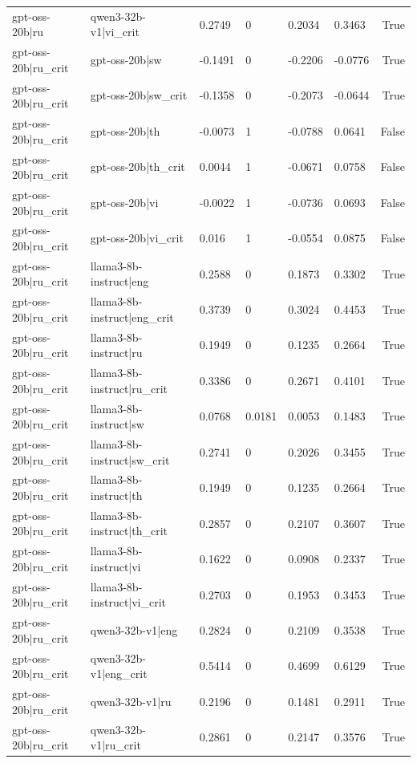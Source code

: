 \begin{table}
\begin{tabular}{llllllr}
gpt-oss-20b|ru & qwen3-32b-v1|vi_crit & 0.2749 & 0 & 0.2034 & 0.3463 & True \\
gpt-oss-20b|ru_crit & gpt-oss-20b|sw & -0.1491 & 0 & -0.2206 & -0.0776 & True \\
gpt-oss-20b|ru_crit & gpt-oss-20b|sw_crit & -0.1358 & 0 & -0.2073 & -0.0644 & True \\
gpt-oss-20b|ru_crit & gpt-oss-20b|th & -0.0073 & 1 & -0.0788 & 0.0641 & False \\
gpt-oss-20b|ru_crit & gpt-oss-20b|th_crit & 0.0044 & 1 & -0.0671 & 0.0758 & False \\
gpt-oss-20b|ru_crit & gpt-oss-20b|vi & -0.0022 & 1 & -0.0736 & 0.0693 & False \\
gpt-oss-20b|ru_crit & gpt-oss-20b|vi_crit & 0.016 & 1 & -0.0554 & 0.0875 & False \\
gpt-oss-20b|ru_crit & llama3-8b-instruct|eng & 0.2588 & 0 & 0.1873 & 0.3302 & True \\
gpt-oss-20b|ru_crit & llama3-8b-instruct|eng_crit & 0.3739 & 0 & 0.3024 & 0.4453 & True \\
gpt-oss-20b|ru_crit & llama3-8b-instruct|ru & 0.1949 & 0 & 0.1235 & 0.2664 & True \\
gpt-oss-20b|ru_crit & llama3-8b-instruct|ru_crit & 0.3386 & 0 & 0.2671 & 0.4101 & True \\
gpt-oss-20b|ru_crit & llama3-8b-instruct|sw & 0.0768 & 0.0181 & 0.0053 & 0.1483 & True \\
gpt-oss-20b|ru_crit & llama3-8b-instruct|sw_crit & 0.2741 & 0 & 0.2026 & 0.3455 & True \\
gpt-oss-20b|ru_crit & llama3-8b-instruct|th & 0.1949 & 0 & 0.1235 & 0.2664 & True \\
gpt-oss-20b|ru_crit & llama3-8b-instruct|th_crit & 0.2857 & 0 & 0.2107 & 0.3607 & True \\
gpt-oss-20b|ru_crit & llama3-8b-instruct|vi & 0.1622 & 0 & 0.0908 & 0.2337 & True \\
gpt-oss-20b|ru_crit & llama3-8b-instruct|vi_crit & 0.2703 & 0 & 0.1953 & 0.3453 & True \\
gpt-oss-20b|ru_crit & qwen3-32b-v1|eng & 0.2824 & 0 & 0.2109 & 0.3538 & True \\
gpt-oss-20b|ru_crit & qwen3-32b-v1|eng_crit & 0.5414 & 0 & 0.4699 & 0.6129 & True \\
gpt-oss-20b|ru_crit & qwen3-32b-v1|ru & 0.2196 & 0 & 0.1481 & 0.2911 & True \\
gpt-oss-20b|ru_crit & qwen3-32b-v1|ru_crit & 0.2861 & 0 & 0.2147 & 0.3576 & True \\

\end{tabular}
\end{table}
